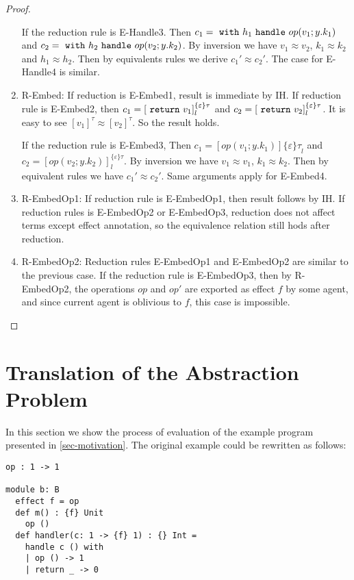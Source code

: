 \begin{theorem}
\begin{proof}
\begin{enumerate}
If the reduction rule is E-Handle3. Then $c_1 = \ \texttt{with}\  h_1 \ \texttt{handle}\  op(v_1; y. k_1)$ and $c_2 = \ \texttt{with}\  h_2 \ \texttt{handle}\  op(v_2; y.k_2) $. By inversion we have $v_1 \approx v_2$, $k_1 \approx k_2$ and $h_1 \approx h_2$. Then by equivalents rules we derive $c_1' \approx c_2'$. The case for E-Handle4 is similar.

\item R-Embed: If reduction is E-Embed1,  result is immediate by IH. If reduction rule is E-Embed2, then $c_1 = [\ \texttt{return}\  v_1]^{\{\varepsilon\}\tau}_l$ and $c_2 = [\ \texttt{return}\  v_2]^{\{\varepsilon\}\tau}_l$. It is easy to see $[v_1]^\tau \approx [v_2]^\tau$. So the result holds.

If the reduction rule is E-Embed3, Then $c_1 = [op(v_1; y. k_1)]{\{\varepsilon\}\tau}_l$ and $c_2 = [op(v_2; y. k_2)]^{\{\varepsilon\}\tau}_l$. By inversion we have $v_1 \approx v_1$, $k_1 \approx k_2$. Then by equivalent rules we have $c_1' \approx c_2'$. Same arguments apply for E-Embed4.

\item R-EmbedOp1: If reduction rule is E-EmbedOp1, then result follows by IH. If reduction rules is E-EmbedOp2 or E-EmbedOp3, reduction does not affect terms except effect annotation, so the equivalence relation still hods after reduction.

\item R-EmbedOp2: Reduction rules E-EmbedOp1 and E-EmbedOp2 are similar to the previous case. If the reduction rule is E-EmbedOp3, then by R-EmbedOp2, the operations $op$ and $op'$ are exported as effect $f$ by some agent, and since current agent is oblivious to $f$, this case is impossible.

\end{enumerate}


\end{proof}


\end{theorem}

\pagebreak
\section{Translation of the Abstraction Problem}
In this section we show the process of evaluation of the example program presented in \ref{sec-motivation}. The original example could be rewritten  as follows:
\begin{lstlisting}[mathescape = true]
op : 1 -> 1
  
module b: B
  effect f = op
  def m() : {f} Unit
    op ()
  def handler(c: 1 -> {f} 1) : {} Int = 
    handle c () with
    | op () -> 1
    | return _ -> 0
\end{lstlisting}

